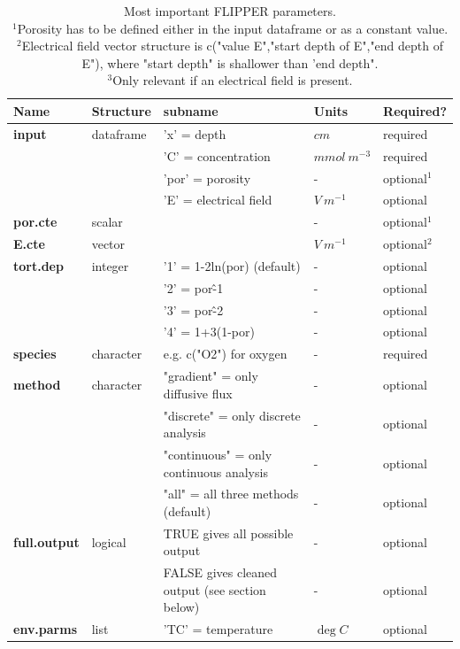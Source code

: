 \documentclass[10pt]{article}
\begin{document}
\begin{table}[!h]
	\small
	\caption{Most important FLIPPER parameters. \\ $^{1}$Porosity has to be defined either in the input dataframe or as a constant value. \\ $^{2}$Electrical field vector structure is c("value E","start depth of E","end depth of E"), where "start depth" is shallower than 'end depth". \\ $^{3}$Only relevant if an electrical field is present.}
	\begin{tabular}{p{2.5cm} p{1.5cm} p{5cm} p{2cm} p{1.5cm} }
		\hline
		\textbf{Name} & \textbf{Structure} & \textbf{subname} & \textbf{Units} & \textbf{Required?} \\     
		 \hline
		\textbf{input} & dataframe & 'x' = depth & $cm$ & required  \\
		 &  & 'C' = concentration & $mmol \: m^{-3}$  & required \\
		 &  & 'por' = porosity & - & optional$^{1}$  \\
		 &  & 'E' = electrical field & $V \: m^{-1}$ & optional   \\
		 \textbf{por.cte} & scalar &   & - & optional$^{1}$ \\
		 \textbf{E.cte} & vector &   & $V \: m^{-1}$ & optional$^{2}$ \\
		 \textbf{tort.dep} & integer & '1' = 1-2ln(por) (default) & - & optional \\
		 &  & '2' = por\^-1 & - & optional \\
		 &  & '3' = por\^-2 & - & optional \\
		 &  & '4' = 1+3(1-por) & - & optional \\
		 \textbf{species} & character & e.g. c("O2") for oxygen  & - & required \\
		 \textbf{method} & character & "gradient" = only diffusive flux  & - & optional \\
		 & & "discrete" = only discrete analysis & - & optional \\
		 & & "continuous" = only continuous analysis & - & optional \\
		 & & "all" = all three methods (default) & - & optional \\
		 \textbf{full.output} & logical & TRUE gives all possible output & - & optional \\
		 &  & FALSE gives cleaned output (see section below) & - & optional \\
		 \textbf{env.parms} & list & 'TC' = temperature & $\deg C$ & optional  \\

\end{tabular}
\end{table}
\end{document}

